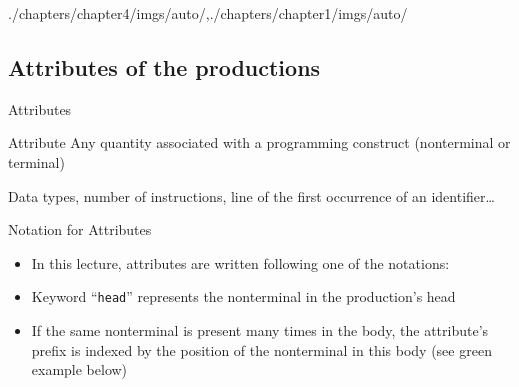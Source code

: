 \begin{graphicspathcontext}{{./chapters/chapter4/imgs/auto/},{./chapters/chapter1/imgs/auto/}}
\begin{bibunit}[apalike]
\subsection{Attributes of the productions}
\subsectiontableofcontentslide

\begin{frame}{Attributes}
	\begin{definitionblock}{Attribute}
		Any quantity associated with a programming construct (nonterminal or terminal)
	\end{definitionblock}
	\vspace{1cm}
	\begin{examples}
		Data types, number of instructions, line of the first occurrence of an identifier\dots
	\end{examples}
\end{frame}

\begin{frame}{Notation for Attributes}
	\begin{itemize}
		\item In this lecture, attributes are written following one of the notations: \\[.25cm]
		\item Keyword ``\texttt{head}'' represents the nonterminal in the production's head
		\item If the same nonterminal is present many times in the body, the attribute's prefix is indexed by the position of the nonterminal in this body (see green example below)
	\end{itemize}
	\vspace{.5cm}
	\begin{sdd}
		\sdddots
	\end{sdd}
\end{frame}


\end{bibunit}
\end{graphicspathcontext}
